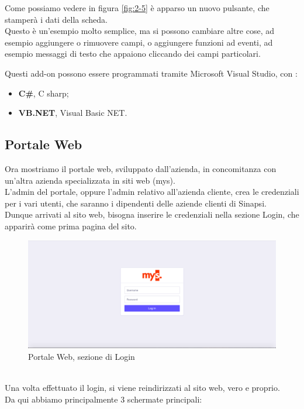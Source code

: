 	\item Come possiamo vedere in figura \ref{fig:2-5} è apparso un nuovo pulsante, che stamperà i dati della scheda.\\Questo è un'esempio molto semplice, ma si possono cambiare altre cose, ad esempio aggiungere o rimuovere campi, o aggiungere funzioni ad eventi, ad esempio messaggi di testo che appaiono cliccando dei campi particolari.
	\item Questi add-on possono essere programmati tramite Microsoft Visual Studio, con :
	\begin{itemize}
		\item \textbf{C\#}, C sharp;
		\item \textbf{VB.NET}, Visual Basic NET.
	\end{itemize}

\newpage
\subsection{Portale Web}
Ora mostriamo il portale web, sviluppato dall'azienda, in concomitanza con un'altra azienda specializzata in siti web (mys).\\
L'admin del portale, oppure l'admin relativo all'azienda cliente, crea le credenziali per i vari utenti, che saranno i dipendenti delle aziende clienti di Sinapsi.\\
Dunque arrivati al sito web, bisogna inserire le credenziali nella sezione Login, che apparirà come prima pagina del sito.\\
\begin{figure}[!h] 
	\centering 
	\includegraphics[scale = 0.3]{immagini/portale/login.png} 
	\caption {Portale Web, sezione di Login}
\end{figure}
\\Una volta effettuato il login, si viene reindirizzati al sito web, vero e proprio.\\
Da qui abbiamo principalmente 3 schermate principali:
